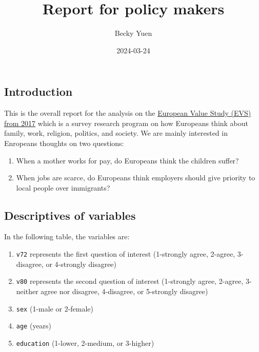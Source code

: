 \documentclass[
]{article}
\title{Report for policy makers}
\author{Becky Yuen}
\date{2024-03-24}
\providecommand{\tightlist}{%
  \setlength{\itemsep}{0pt}\setlength{\parskip}{0pt}}
\begin{document}
\maketitle

\hypertarget{introduction}{%
\subsection{Introduction}\label{introduction}}

This is the overall report for the analysis on the
\href{https://search.gesis.org/research_data/ZA7500}{European Value
Study (EVS) from 2017} which is a survey research program on how
Europeans think about family, work, religion, politics, and society. We
are mainly interested in Enropeans thoughts on two questions:

\begin{enumerate}
\def\labelenumi{\arabic{enumi}.}
\tightlist
\item
  When a mother works for pay, do Europeans think the children suffer?
\item
  When jobs are scarce, do Europeans think employers should give
  priority to local people over immigrants?
\end{enumerate}

\hypertarget{descriptives-of-variables}{%
\subsection{Descriptives of variables}\label{descriptives-of-variables}}

In the following table, the variables are:

\begin{enumerate}
\def\labelenumi{\arabic{enumi}.}
\tightlist
\item
  \texttt{v72} represents the first question of interest (1-strongly
  agree, 2-agree, 3-disagree, or 4-strongly disagree)
\item
  \texttt{v80} represents the second question of interest (1-strongly
  agree, 2-agree, 3-neither agree nor disagree, 4-disagree, or
  5-strongly disagree)
\item
  \texttt{sex} (1-male or 2-female)
\item
  \texttt{age} (years)
\item
  \texttt{education} (1-lower, 2-medium, or 3-higher)
\end{enumerate}
\end{document}
